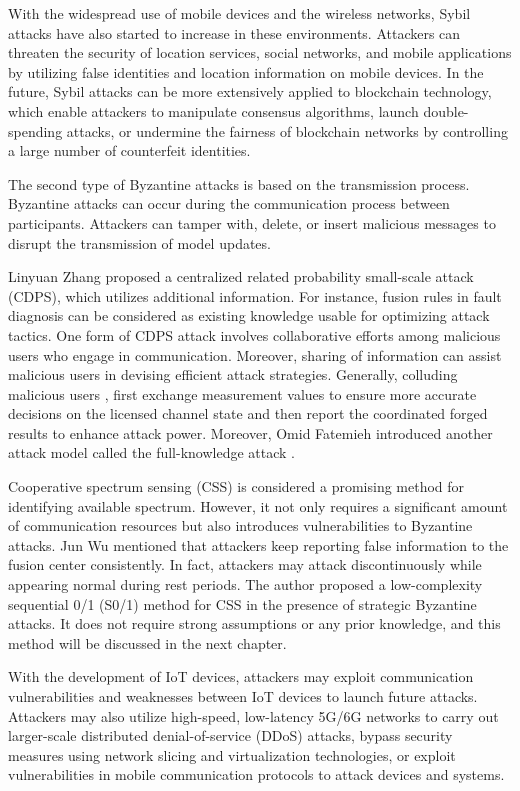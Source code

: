 \documentclass[conference]{IEEEtran}
\begin{document}
With the widespread use of mobile devices and the wireless networks, Sybil attacks have also 
started to increase in these environments. Attackers can threaten the security of location services, 
social networks, and mobile applications by utilizing false identities and location information on
 mobile devices. In the future, Sybil attacks can be more extensively applied to blockchain 
 technology, which enable attackers to manipulate consensus algorithms, launch double-spending 
 attacks, or undermine the fairness of blockchain networks by controlling a large number of 
 counterfeit identities.

 The second type of Byzantine attacks is based on the transmission process. Byzantine attacks can 
 occur during the communication process between participants. Attackers can tamper with, delete, or 
 insert malicious messages to disrupt the transmission of model updates.

Linyuan Zhang \cite{b114} proposed a centralized related probability small-scale attack (CDPS), 
which utilizes additional information. For instance, fusion rules in fault diagnosis \cite{b115} can be 
considered as existing knowledge usable for optimizing attack tactics. One form of CDPS attack 
involves collaborative efforts among malicious users who engage in communication. Moreover, sharing 
of information can assist malicious users in devising efficient attack strategies. Generally, 
colluding malicious users \cite{b116},\cite{b117} first exchange measurement values to ensure more accurate decisions 
on the licensed channel state and then report the coordinated forged results to enhance attack power. 
Moreover, Omid Fatemieh introduced another attack model called the full-knowledge attack \cite{b118}.

Cooperative spectrum sensing (CSS) is considered a promising method for identifying available 
spectrum. However, it not only requires a significant amount of communication resources but also 
introduces vulnerabilities to Byzantine attacks. Jun Wu \cite{b119} mentioned that attackers keep reporting 
false information to the fusion center consistently. In fact, attackers may attack discontinuously
 while appearing normal during rest periods. The author proposed a low-complexity sequential 0/1 
 (S0/1) method for CSS in the presence of strategic Byzantine attacks. It does not require strong 
 assumptions or any prior knowledge, and this method will be discussed in the next chapter.

 With the development of IoT devices, attackers may exploit communication vulnerabilities and 
 weaknesses between IoT devices to launch future attacks. Attackers may also utilize high-speed, 
 low-latency 5G/6G networks to carry out larger-scale distributed denial-of-service (DDoS) attacks,
  bypass security measures using network slicing and virtualization technologies, or exploit 
  vulnerabilities in mobile communication protocols to attack devices and systems.
\end{document}
